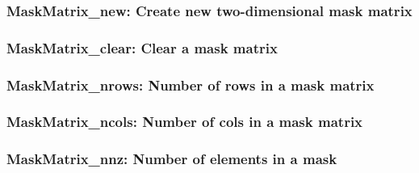 \subsubsection{{\sf MaskMatrix\_new}: Create new two-dimensional mask matrix}

\subsubsection{{\sf MaskMatrix\_clear}: Clear a mask matrix}

\subsubsection{{\sf MaskMatrix\_nrows}: Number of rows in a mask matrix}

\subsubsection{{\sf MaskMatrix\_ncols}: Number of cols in a mask matrix}

\subsubsection{{\sf MaskMatrix\_nnz}: Number of elements in a mask}
